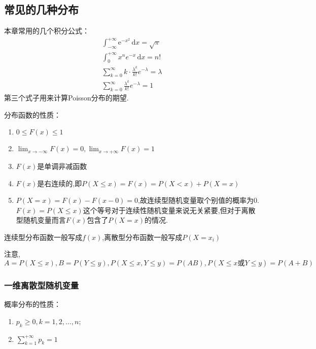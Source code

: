 \subsection{常见的几种分布}
本章常用的几个积分公式：
\begin{gather*}
    \int_{-\infty}^{+\infty} \mathrm{e} ^{-x^2} \,\mathrm{d}x =\sqrt{\pi}\\
    \int_{0}^{+\infty} x^ne^{-x} \,\mathrm{d}x =n!\\
    \sum_{k=0}^{\infty} k\cdot \frac{\lambda^k}{k!}e^{-\lambda}=\lambda\\
    \sum_{k=0}^{\infty} \frac{\lambda^k}{k!}e^{-\lambda}=1
\end{gather*}
第三个式子用来计算Poisson分布的期望.

分布函数的性质：
\begin{enumerate}
    \item $0 \leqslant F(x) \leqslant 1$
    \item $\lim_{x \to -\infty} F(x)=0,\lim_{x \to +\infty} F(x)=1$
    \item $F(x)$是单调非减函数
    \item $F(x)$是右连续的,即$P(X \leqslant x)=F(x)=P(X<x)+P(X=x)$
    \item $P(X=x)=F(x)-F(x-0)=0$,故连续型随机变量取个别值的概率为0.$F(x)=P(X \leqslant x)$这个等号对于连续性随机变量来说无关紧要,但对于离散型随机变量而言$F(x)$包含了$P(X=x)$的情况.
\end{enumerate}

连续型分布函数一般写成$f(x)$,离散型分布函数一般写成$P(X=x_i)$

注意,$A=P(X \leqslant x),B=P(Y \leqslant y),P(X \leqslant x,Y \leqslant y)=P(AB),P(X \leqslant x\text{或}Y \leqslant y)=P(A+B)$
\subsubsection{一维离散型随机变量}
概率分布的性质：
\begin{enumerate}
    \item $p_k \geqslant 0,k=1,2,\dots,n;$
    \item $\sum_{k=1}^{+\infty} p_k=1$
\end{enumerate}

